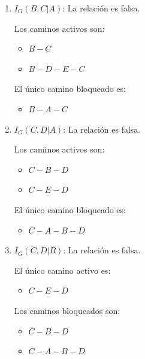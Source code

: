 \documentclass[12pt,a4paper]{article}
\begin{document}
\begin{enumerate}
    \item $I_G(B, C | A)$: \; La relación es falsa.
    
    Los caminos activos son:
    \begin{multicols}{2}
        \begin{itemize}
            \item $B-C$
            \item $B-D-E-C$
        \end{itemize}
    \end{multicols}
    El único camino bloqueado es:
    \begin{multicols}{2}
        \begin{itemize}
            \item $B-A-C$
        \end{itemize}
    \end{multicols}

    \item $I_G(C, D | A)$: \; La relación es falsa.
    
    Los caminos activos son:
    \begin{multicols}{2}
        \begin{itemize}
            \item $C-B-D$
            \item $C-E-D$
        \end{itemize}
    \end{multicols}
    El único camino bloqueado es:
    \begin{multicols}{2}
        \begin{itemize}
            \item $C-A-B-D$
        \end{itemize}
    \end{multicols}
    
    \item $I_G(C, D | B)$: \; La relación es falsa.
    
    El único camino activo es:
    \begin{multicols}{2}
        \begin{itemize}
            \item $C-E-D$
        \end{itemize}
    \end{multicols}
    Los caminos bloqueados son:
    \begin{multicols}{2}
        \begin{itemize}
            \item $C-B-D$
            \item $C-A-B-D$
        \end{itemize}
    \end{multicols}


\end{enumerate}
\end{document}
